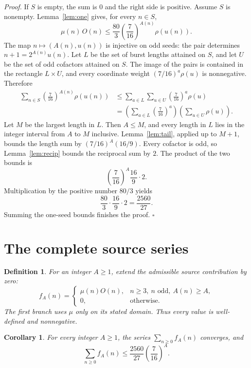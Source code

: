 \documentclass[11pt,letterpaper]{article}
\newtheorem{corollary}[theorem]{Corollary}
\newtheorem{definition}[theorem]{Definition}
\newenvironment{proof}{\noindent\textit{Proof.}}{\hfill\(\square\)}
\begin{document}
\begin{proof}
If \(S\) is empty, the sum is \(0\) and the right side is positive. Assume \(S\) is nonempty. Lemma~\ref{lem:one} gives, for every \(n\in S\),
\[
\mu(n)\,O(n)
\le\frac{80}{3}\left(\frac{7}{16}\right)^{A(n)}\rho(u(n)).
\]
The map \(n\mapsto(A(n),u(n))\) is injective on odd seeds: the pair determines \(n+1=2^{A(n)}u(n)\). Let \(L\) be the set of burst lengths attained on \(S\), and let \(U\) be the set of odd cofactors attained on \(S\). The image of the pairs is contained in the rectangle \(L\times U\), and every coordinate weight \((7/16)^{a}\rho(u)\) is nonnegative. Therefore
\begin{align*}
\sum_{n\in S}\left(\frac{7}{16}\right)^{A(n)}\rho(u(n))
&\le\sum_{a\in L}\sum_{u\in U}\left(\frac{7}{16}\right)^{a}\rho(u)\\
&=\left(\sum_{a\in L}\left(\frac{7}{16}\right)^{a}\right)
\left(\sum_{u\in U}\rho(u)\right).
\end{align*}
Let \(M\) be the largest length in \(L\). Then \(A\le M\), and every length in \(L\) lies in the integer interval from \(A\) to \(M\) inclusive. Lemma~\ref{lem:tail}, applied up to \(M+1\), bounds the length sum by \((7/16)^{A}(16/9)\). Every cofactor is odd, so Lemma~\ref{lem:recip} bounds the reciprocal sum by \(2\). The product of the two bounds is
\[
\left(\frac{7}{16}\right)^{A}\frac{16}{9}\cdot 2.
\]
Multiplication by the positive number \(80/3\) yields
\[
\frac{80}{3}\cdot\frac{16}{9}\cdot 2
=\frac{2560}{27}.
\]
Summing the one-seed bounds finishes the proof.
\end{proof}

\section{The complete source series}

\begin{definition}
For an integer \(A\ge1\), extend the admissible source contribution by zero:
\[
f_A(n)=
\begin{cases}
\mu(n)O(n),&n\ge3,\ n\text{ odd},\ A(n)\ge A,\\
0,&\text{otherwise}.
\end{cases}
\]
The first branch uses \(\mu\) only on its stated domain. Thus every value is well-defined and nonnegative.
\end{definition}

\begin{corollary}
\label{cor:series}
For every integer \(A\ge1\), the series \(\sum_{n\ge0}f_A(n)\) converges, and
\[
\sum_{n\ge0}f_A(n)
\le\frac{2560}{27}\left(\frac7{16}\right)^A.
\]
\end{corollary}
\end{document}
